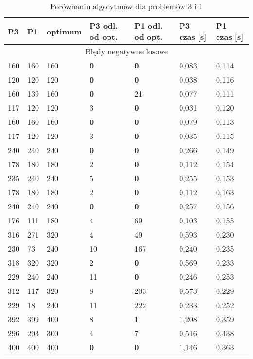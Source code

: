 \documentclass[a4paper]{article}
\begin{document}
\begin{table}[H]
\caption{Porównaniu algorytmów dla problemów 3 i 1}
\begin{tabular}{|p{1.6cm}|p{1.6cm}|p{1.6cm}|p{1.6cm}|p{1.6cm}|p{1.6cm}|p{1.6cm}|}
\hline
\multicolumn{1}{|l|}{P3} & \multicolumn{1}{l|}{P1} &
\multicolumn{1}{l|}{optimum} & \multicolumn{1}{l|}{P3 odl. od opt.} &
\multicolumn{1}{l|}{P1 odl. od opt.} &
\multicolumn{1}{l|}{P3 czas [s]} &
\multicolumn{1}{l|}{P1 czas [s]} \\ \hline
\multicolumn{7}{|c|}{Błędy negatywne losowe} \\ \hline
160 & 160 & 160 & \textbf{0} & \textbf{0} & 0,083 & 0,114 \\ \hline
120 & 120 & 120 & \textbf{0} & \textbf{0} & 0,038 & 0,116 \\ \hline
160 & 139 & 160 & \textbf{0} & 21 & 0,077 & 0,111 \\ \hline
117 & 120 & 120 & 3 & \textbf{0} & 0,031 & 0,120 \\ \hline
160 & 160 & 160 & \textbf{0} & \textbf{0} & 0,079 & 0,113 \\ \hline
117 & 120 & 120 & 3 & \textbf{0} & 0,035 & 0,115 \\ \hline
240 & 240 & 240 & \textbf{0} & \textbf{0} & 0,266 & 0,149 \\ \hline
178 & 180 & 180 & 2 & \textbf{0} & 0,112 & 0,154 \\ \hline
235 & 240 & 240 & 5 & \textbf{0} & 0,255 & 0,153 \\ \hline
178 & 180 & 180 & 2 & \textbf{0} & 0,112 & 0,163 \\ \hline
240 & 240 & 240 & \textbf{0} & \textbf{0} & 0,257 & 0,156 \\ \hline
176 & 111 & 180 & 4 & 69 & 0,103 & 0,155 \\ \hline
316 & 271 & 320 & 4 & 49 & 0,593 & 0,230 \\ \hline
230 & 73 & 240 & 10 & 167 & 0,240 & 0,235 \\ \hline
318 & 320 & 320 & 2 & \textbf{0} & 0,569 & 0,233 \\ \hline
229 & 240 & 240 & 11 & \textbf{0} & 0,246 & 0,253 \\ \hline
312 & 117 & 320 & 8 & 203 & 0,573 & 0,229 \\ \hline
229 & 18 & 240 & 11 & 222 & 0,233 & 0,252 \\ \hline
392 & 399 & 400 & 8 & 1 & 1,208 & 0,359 \\ \hline
296 & 293 & 300 & 4 & 7 & 0,516 & 0,438 \\ \hline
400 & 400 & 400 & \textbf{0} & \textbf{0} & 1,146 & 0,363 \\ \hline

\end{tabular}
\end{table}
\end{document}
